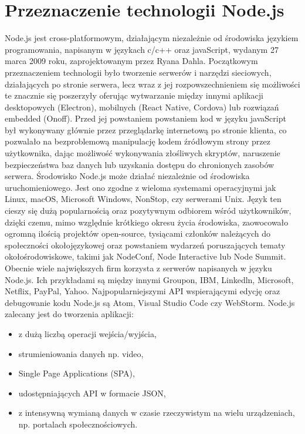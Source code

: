 \documentclass[12pt]{report}
\begin{document}
  \section{Przeznaczenie technologii Node.js}
    Node.js jest cross-platformowym, działającym niezależnie od środowiska językiem programowania, napisanym w językach c/c++ oraz javaScript, wydanym 27 marca 2009 roku, zaprojektowanym przez Ryana Dahla.
    Początkowym przeznaczeniem technologii było tworzenie serwerów i narzędzi sieciowych, działających po stronie serwera, lecz wraz z jej rozpowszechnieniem się możliwości te znacznie się poszerzyły oferując wytwarzanie między innymi aplikacji desktopowych (Electron), mobilnych (React Native, Cordova) lub rozwiązań embedded (Onoff).
    Przed jej powstaniem powstaniem kod w języku javaScript był wykonywany głównie przez przeglądarkę internetową po stronie klienta, co pozwalało na bezproblemową manipulację kodem źródłowym strony przez użytkownika, dając możliwość wykonywania złośliwych skryptów, naruszenie bezpieczeństwa baz danych lub uzyskania dostępu do chronionych zasobów serwera.
    Środowisko Node.js może działać niezależnie od środowiska uruchomieniowego.
    Jest ono zgodne z wieloma systemami operacyjnymi jak  Linux, macOS, Microsoft Windows, NonStop, czy serwerami Unix.
    Język ten cieszy się dużą popularnością oraz pozytywnym odbiorem wśród użytkowników, dzięki czemu, mimo względnie krótkiego okresu życia środowiska, zaowocowało ogromną ilością projektów open-source, tysiącami członków należących do społeczności okołojęzykowej oraz powstaniem wydarzeń poruszających tematy okołośrodowiskowe, takimi jak NodeConf, Node Interactive lub Node Summit.
    Obecnie wiele największych firm korzysta z serwerów napisanych w języku Node.js.
    Ich przykładami są między innymi Groupon, IBM, Linkedln, Microsoft, Netflix, PayPal, Yahoo.
    Najpopularniejszymi API wspierającymi edycję oraz debugowanie kodu Node.js są Atom, Visual Studio Code czy WebStorm.
    \newline Node.js zalecany jest do tworzenia aplikacji: 
    \begin{itemize}
      \item z dużą liczbą operacji wejścia/wyjścia,
      \item strumieniowania danych np. video, 
      \item Single Page Applications (SPA),
      \item udostępniających API w formacie JSON,
      \item z intensywną wymianą danych w czasie rzeczywistym na wielu urządzeniach, np. portalach społecznościowych.
    \end{itemize} 
\end{document}
